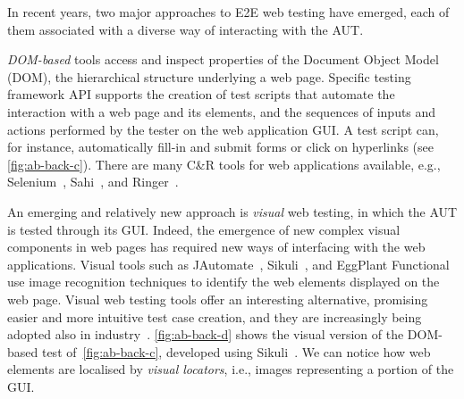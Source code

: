 In recent years, two major approaches to E2E web testing have emerged, each of them associated with a diverse way of interacting with the AUT. 

\textit{DOM-based} tools access and inspect properties of the Document Object Model (DOM), the hierarchical structure underlying a web page. 
Specific testing framework API supports the creation of test scripts that automate the interaction with a web page and its elements, and the sequences of inputs and actions performed by the tester on the web application GUI. A test script can, for instance, automatically fill-in and submit forms or click on hyperlinks (see \autoref{fig:ab-back-c}). There are many C\&R tools for web applications available, e.g., Selenium~\cite{selenium}, Sahi~\cite{sahi}, and Ringer~\cite{ringer}. %

An emerging and relatively new approach is \textit{visual} web testing, in which the AUT is tested through its GUI. Indeed, the emergence of new complex visual components in web pages has required new ways of interfacing with the web applications. Visual tools such as JAutomate~\cite{Alegroth2013jat}, Sikuli~\cite{Sikuli}, and EggPlant Functional~\cite{eggplant} use image recognition techniques to identify the web elements displayed on the web page. Visual web testing tools offer an interesting alternative, promising easier and more intuitive test case creation, and they are increasingly being adopted also in industry~\cite{Alegroth2013jat}. 
\autoref{fig:ab-back-d} shows the visual version of the DOM-based test of~\autoref{fig:ab-back-c}, developed using Sikuli~\cite{Sikuli}. We can notice how web elements are localised by \textit{visual locators}, i.e., images representing a portion of the GUI.

